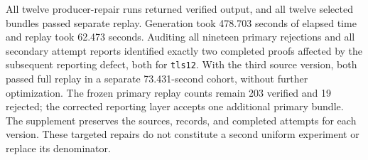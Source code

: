 All twelve producer-repair runs returned verified output, and all twelve
selected bundles passed separate replay. Generation took 478.703 seconds of
elapsed time and replay took 62.473 seconds. Auditing all nineteen primary
rejections and all secondary attempt reports identified exactly two completed
proofs affected by the subsequent reporting defect, both for \texttt{tls12}.
With the third source version, both passed full replay in a separate
73.431-second cohort, without further optimization. The frozen primary replay
counts remain 203 verified and 19 rejected; the corrected reporting layer
accepts one additional primary bundle. The supplement preserves the sources,
records, and completed attempts for each version. These targeted repairs do
not constitute a second uniform experiment or replace its denominator.
